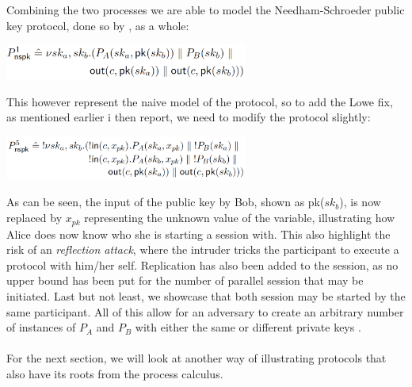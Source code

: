 \noindent Combining the two processes we are able to model the Needham-Schroeder public key protocol, done so by \citeauthor{DBLP:journals/ftpl/CortierK14}, as a whole: 
\begin{center}
\includegraphics[width=0.6\textwidth, angle=0]{Graphics/P1_nspk.pdf}
\end{center}
This however represent the naive model of the protocol, so to add the Lowe fix, as mentioned earlier i then report, we need to modify the protocol slightly:
\begin{center}
\includegraphics[width=0.6\textwidth, angle=0]{Graphics/P5_nspk.pdf}
\end{center}
As can be seen, the input of the public key by Bob, shown as pk($sk_b$), is now replaced by $x_{pk}$ representing the unknown value of the variable, illustrating how Alice does now know who she is starting a session with. This also highlight the risk of an \textit{reflection attack}, where the intruder tricks the participant to execute a protocol with him/her self. Replication has also been added to the session, as no upper bound has been put for the number of parallel session that may be initiated. Last but not least, we showcase that both session may be started by the same participant. All of this allow for an adversary to create an arbitrary number of instances of $P_A$ and $P_B$ with either the same or different private keys \autocite{DBLP:journals/ftpl/CortierK14}. \\ \\
For the next section, we will look at another way of illustrating protocols that also have its roots from the process calculus.  

